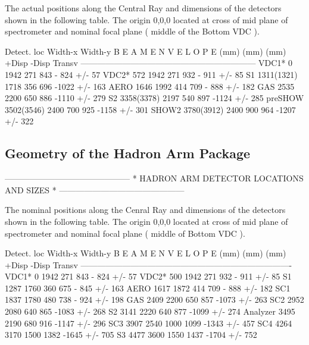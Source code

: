 The actual positions along the Central Ray and dimensions of the detectors shown in 
the following table. The origin 0,0,0 located at cross of mid plane of spectrometer 
and nominal focal plane ( middle of the Bottom VDC ).

Detect.     loc     Width-x  Width-y   B E A M  E N V E L O P E 
            (mm)      (mm)     (mm)    +Disp   -Disp   Transv     
---------------------------------------------------------------  
VDC1*        0        1942     271      843    - 824   +/-  57  
VDC2*       572       1942     271      932    - 911   +/-  85 
S1         1311(1321) 1718     356      696    -1022   +/- 163   
AERO       1646       1992     414      709    - 888   +/- 182   
GAS        2535       2200     650      886    -1110   +/- 279   
S2         3358(3378) 2197     540      897    -1124   +/- 285  
preSHOW    3502(3546) 2400     700      925    -1158   +/- 301   
SHOW2      3780(3912) 2400     900      964    -1207   +/- 322   


\subsection{Geometry of the Hadron Arm Package}
              ---------------------------------------------
              *  HADRON ARM DETECTOR LOCATIONS AND SIZES  *
              ---------------------------------------------

The nominal positions along the Cenral Ray and dimensions of the detectors shown in 
the following table. The origin 0,0,0 located at cross of mid plane of spectrometer 
and nominal focal plane ( middle of Bottom VDC ).

Detect.     loc     Width-x  Width-y   B E A M  E N V E L O P E 
            (mm)      (mm)     (mm)    +Disp   -Disp   Transv    
----------------------------------------------------------------------------
VDC1*        0        1942     271      843    - 824   +/-  57  
VDC2*       500       1942     271      932    - 911   +/-  85 
S1         1287       1760     360      675    - 845   +/- 163   
AERO       1617       1872     414      709    - 888   +/- 182  
SC1        1837       1780     480      738    - 924   +/- 198   
GAS        2409       2200     650      857    -1073   +/- 263   
SC2        2952       2080     640      865    -1083   +/- 268   
S2         3141       2220     640      877    -1099   +/- 274   
Analyzer   3495       2190     680      916    -1147   +/- 296   
SC3        3907       2540    1000     1099    -1343   +/- 457  
SC4        4264       3170    1500     1382    -1645   +/- 705   
S3         4477       3600    1550     1437    -1704   +/- 752  

